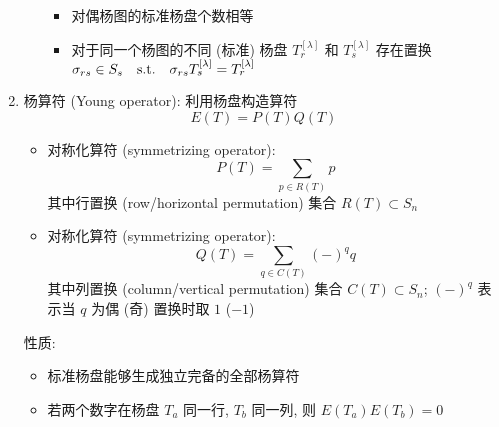 \documentclass[12pt,a4paper]{article}%
\numberwithin{equation}{section}%
\begin{document}
\begin{enumerate}
\begin{itemize}
{		}
		\begin{itemize}
			\item 对偶杨图的标准杨盘个数相等
			\item 对于同一个杨图的不同 (标准) 杨盘 $T_r^{[\lambda]}$ 和 $T_s^{[\lambda]}$ 存在置换 $\sigma_{rs}\in S_s\quad\mathrm{s.t.}\quad \sigma_{rs}T_s^{[\lambda]} = T_r^{[\lambda]}$
		\end{itemize}
	\end{itemize}
	\item 杨算符 (Young operator): 利用杨盘构造算符
	\begin{equation}
		E(T) = P(T)Q(T)
	\end{equation}
	\begin{itemize}
		\item 对称化算符 (symmetrizing operator): 
		\begin{equation}
			P(T) = \sum_{p\in R(T)}p
		\end{equation}
		其中行置换 (row/horizontal permutation) 集合 $R(T)\subset S_n$
		\item 对称化算符 (symmetrizing operator): 
		\begin{equation}
			Q(T) = \sum_{q\in C(T)}(-)^q q
		\end{equation}
		其中列置换 (column/vertical permutation) 集合 $C(T)\subset S_n$; $(-)^q$ 表示当 $q$ 为偶 (奇) 置换时取 $1$ ($-1$)
	\end{itemize}
	性质:
	\begin{itemize}
		\item 标准杨盘能够生成独立完备的全部杨算符
		\item 若两个数字在杨盘 $T_a$ 同一行, $T_b$ 同一列, 则 $E(T_a)E(T_b) = 0$
	\end{itemize}
\end{enumerate}
\end{document}
